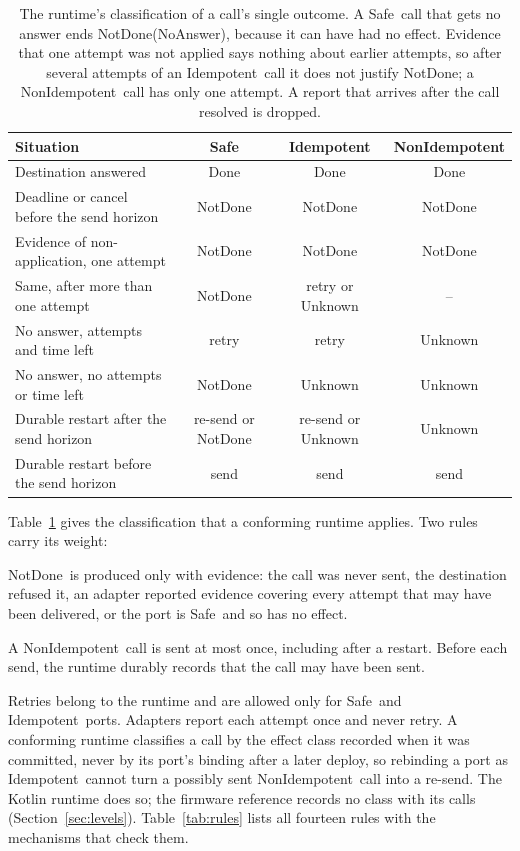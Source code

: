\documentclass[11pt]{article}
\theoremstyle{definition}
\theoremstyle{plain}
\newcommand{\Done}{\textsf{Done}}
\newcommand{\NotDone}{\textsf{NotDone}}
\newcommand{\Unknown}{\textsf{Unknown}}
\newcommand{\Safe}{\textsf{Safe}}
\newcommand{\Idem}{\textsf{Idempotent}}
\newcommand{\NonIdem}{\textsf{NonIdempotent}}
\begin{document}
\begin{table}[t]
\centering\small
\begin{tabular}{@{}lccc@{}}
\toprule
Situation & \Safe & \Idem & \NonIdem \\
\midrule
Destination answered & \Done & \Done & \Done \\
Deadline or cancel before the send horizon & \NotDone & \NotDone & \NotDone \\
Evidence of non-application, one attempt & \NotDone & \NotDone & \NotDone \\
Same, after more than one attempt & \NotDone & retry or \Unknown & -- \\
No answer, attempts and time left & retry & retry & \Unknown \\
No answer, no attempts or time left & \NotDone & \Unknown & \Unknown \\
Durable restart after the send horizon & re-send or \NotDone & re-send or \Unknown & \Unknown \\
Durable restart before the send horizon & send & send & send \\
\bottomrule
\end{tabular}
\caption{The runtime's classification of a call's single outcome. A \Safe\ call that gets no answer ends \NotDone(\textsf{NoAnswer}), because it can have had no effect. Evidence that one attempt was not applied says nothing about earlier attempts, so after several attempts of an \Idem\ call it does not justify \NotDone; a \NonIdem\ call has only one attempt. A report that arrives after the call resolved is dropped.}
\label{tab:classification}
\end{table}

Table~\ref{tab:classification} gives the classification that a conforming runtime applies. Two rules carry its weight:
\begin{description}[leftmargin=1em]
  \item[R7 (honest outcomes).] \NotDone\ is produced only with evidence: the call was never sent, the destination refused it, an adapter reported evidence covering every attempt that may have been delivered, or the port is \Safe\ and so has no effect.
  \item[R8 (no blind re-send).] A \NonIdem\ call is sent at most once, including after a restart. Before each send, the runtime durably records that the call may have been sent.
\end{description}
Retries belong to the runtime and are allowed only for \Safe\ and \Idem\ ports. Adapters report each attempt once and never retry. A conforming runtime classifies a call by the effect class recorded when it was committed, never by its port's binding after a later deploy, so rebinding a port as \Idem\ cannot turn a possibly sent \NonIdem\ call into a re-send. The Kotlin runtime does so; the firmware reference records no class with its calls (Section~\ref{sec:levels}). Table~\ref{tab:rules} lists all fourteen rules with the mechanisms that check them.
\end{document}
